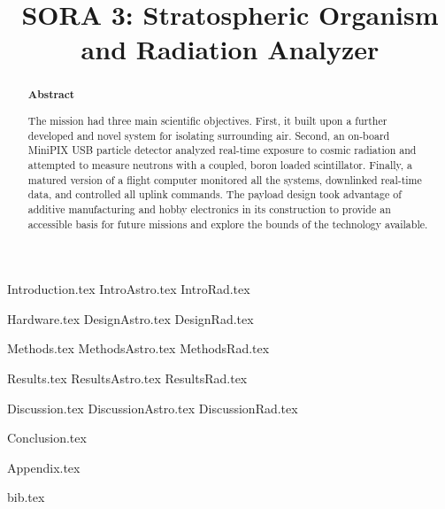 \documentclass[aps,superscriptaddress,floatfix,nofootinbib,showpacs,amsmath,amssymb,altaffilletter,floatfix,onecolumn]{revtex4-1}
\begin{document}
\title{SORA 3: Stratospheric Organism and Radiation Analyzer}

\begin{abstract}
\begin{center}
{\bf Abstract}
\end{center}
\frenchspacing


The mission had three main scientific objectives. 
First, it built upon a further developed and novel system for isolating surrounding air. 
Second, an on-board MiniPIX USB particle detector analyzed real-time exposure to cosmic radiation and attempted to measure neutrons with a coupled, boron loaded scintillator.
Finally, a matured version of a flight computer monitored all the systems, downlinked real-time data, and controlled all uplink commands.
The payload design took advantage of additive manufacturing and hobby electronics in its construction to provide an accessible basis for future missions and explore the bounds of the technology available. 

\newpage %
\end{abstract}

\setlength{\parindent}{1em}
\setdefaultleftmargin{1em}{1em}{}{}{}{}
\setcounter{page}{0}\thispagestyle{empty}
\maketitle
\onecolumngrid
\setcounter{tocdepth}{2}
\setcounter{page}{0}\thispagestyle{empty}
\tableofcontents
\setcounter{page}{0}\thispagestyle{empty}
\newpage
\onecolumngrid

{Introduction.tex}
{IntroAstro.tex}
{IntroRad.tex}

{Hardware.tex}
{DesignAstro.tex}
{DesignRad.tex}

{Methods.tex}
{MethodsAstro.tex}
{MethodsRad.tex}

{Results.tex} 
{ResultsAstro.tex} 
{ResultsRad.tex} 

{Discussion.tex}
{DiscussionAstro.tex}
{DiscussionRad.tex}

{Conclusion.tex} 
\newpage

{Appendix.tex}
\newpage

{bib.tex}%

\clearpage

\end{document}
